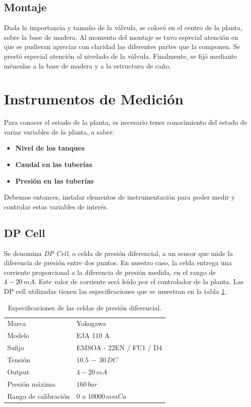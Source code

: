 \subsection{Montaje}
Dada la importancia y tamaño de la válvula, se colocó en el centro de
la planta, sobre la base de madera.
Al momento del montaje se tuvo especial atención en que se pudieran apreciar
con claridad las diferentes partes que la componen.
Se prestó especial atención al nivelado de la válvula.
Finalmente, se fijó mediante ménsulas a la base de madera y a la estructura
de caño.

\section{Instrumentos de Medición}
\label{sec:InstrumentosMedicion}
Para conocer el estado de la planta, es necesario tener conocimiento del
estado de varias variables de la planta, a saber:
\begin{itemize}
 \item \textbf{Nivel de los tanques}
 \item \textbf{Caudal en las tuberías}
 \item \textbf{Presión en las tuberías}
\end{itemize}
Debemos entonces, instalar elementos de instrumentación para poder 
medir y controlar estas variables de interés.

\subsection{DP Cell}
\label{subsec:DPCell}

Se denomina \textit{DP Cell}, o celda de presión diferencial, a un sensor
que mide la diferencia de presión entre dos puntos.
En nuestro caso, la celda entrega una corriente proporcional a la diferencia de
presión medida, en el rango de $4-20\,mA$.
Este valor de corriente será leído por el controlador de la planta.
Las DP cell utilizadas tienen las especificaciones que se muestran en la tabla
\ref{tab:caractDPcell}.

\begin{table}
\centering
\begin{tabular}{|l|l|}
\hline
Marca & Yokogawa\\
Modelo & EJA 110 A\\
Sufijo & EMSOA - 22EN / FU1 / D4\\
Tensión & $10.5\,-\,30 \, DC$\\
Output & $4-20\,mA$\\
Presión máxima & $160\,bar$\\
Rango de calibración & $0$ a $10000\,mmCa$\\
\hline
\end{tabular}
\caption{Especificaciones de las celdas de presión diferencial.}
\label{tab:caractDPcell}
\end{table}

